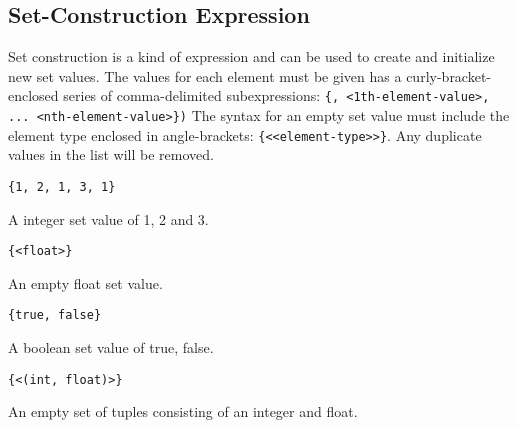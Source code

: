 
\subsection{Set-Construction Expression}
{
	Set construction is a kind of expression and can be
	used to create and initialize new set values.
	The values for each element must be given has a curly-bracket-enclosed
	series of comma-delimited
	subexpressions: \texttt{\{<0th-element-value>, <1th-element-value>, ... <nth-element-value>\})}
	The syntax for an empty set value must include the element type enclosed
	in angle-brackets: \texttt{\{<<element-type>>\}}.
	Any duplicate values in the list will be removed.
	
	\begin{itemize}
	{
		\item[] \texttt{\{1, 2, 1, 3, 1\}}
		
			A integer set value of 1, 2 and 3.
		
		\item[] \texttt{\{<float>\}}
		
			An empty float set value.
		
		\item[] \texttt{\{true, false\}}
		
			A boolean set value of true, false.
		
		\item[] \texttt{\{<(int, float)>\}}
		
			An empty set of tuples consisting
				of an integer and float.
	}
	\end{itemize}
}
